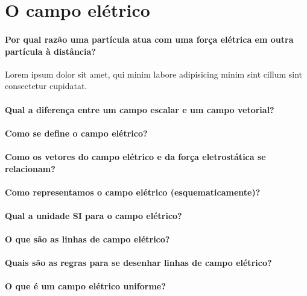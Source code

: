 
\section*{O campo elétrico}

  \paragraph{Por qual razão uma partícula atua com uma força elétrica em outra partícula à distância?} Lorem ipsum dolor sit amet, qui minim labore adipisicing minim sint cillum sint consectetur cupidatat.

  \paragraph{Qual a diferença entre um campo escalar e um campo vetorial?}

  \paragraph{Como se define o campo elétrico?} 

  \paragraph{Como os vetores do campo elétrico e da força eletrostática se relacionam?}

  \paragraph{Como representamos o campo elétrico (esquematicamente)?}

  \paragraph{Qual a unidade SI para o campo elétrico?}

  \paragraph{O que são as linhas de campo elétrico?}

  \paragraph{Quais são as regras para se desenhar linhas de campo elétrico?}

  \paragraph{O que é um campo elétrico uniforme?}

